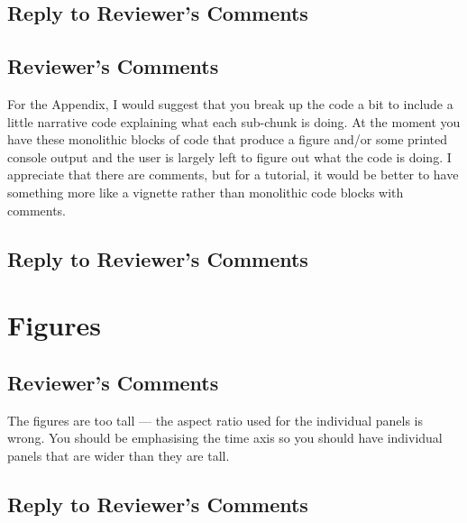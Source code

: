 \documentclass[
]{article}
\begin{document}
\hypertarget{section-10}{%
\subsection{\texorpdfstring{\textcolor{reviewersblue} {Reply to Reviewer's Comments}}{}}\label{section-10}}

\hypertarget{reviewers-comments-11}{%
\subsection{Reviewer's Comments}\label{reviewers-comments-11}}

For the Appendix, I would suggest that you break up the code a bit to include a little narrative code explaining what each sub-chunk is doing. At the moment you have these monolithic blocks of code that produce a figure and/or some
printed console output and the user is largely left to figure out what the code is doing. I appreciate that there are comments, but for a tutorial, it would be better to have something more like a vignette rather than monolithic code
blocks with comments.

\hypertarget{section-11}{%
\subsection{\texorpdfstring{\textcolor{reviewersblue} {Reply to Reviewer's Comments}}{}}\label{section-11}}

\hypertarget{figures}{%
\section{Figures}\label{figures}}

\hypertarget{reviewers-comments-12}{%
\subsection{Reviewer's Comments}\label{reviewers-comments-12}}

The figures are too tall --- the aspect ratio used for the individual panels is wrong. You should be emphasising the time axis so you should have individual panels that are wider than they are tall.

\hypertarget{section-12}{%
\subsection{\texorpdfstring{\textcolor{reviewersblue} {Reply to Reviewer's Comments}}{}}\label{section-12}}
\end{document}
